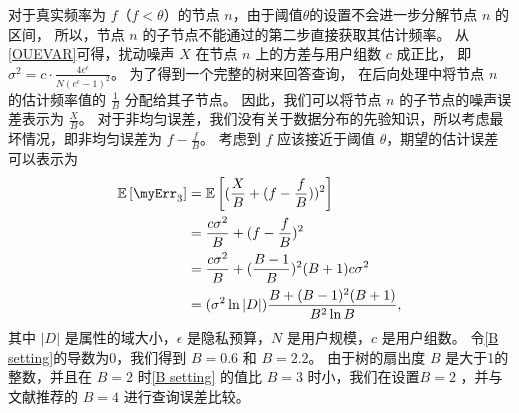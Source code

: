 对于真实频率为 $f$（$f<\theta$）的节点 $n$，\myahead 由于阈值$\theta$的设置不会进一步分解节点 $n$ 的区间，
所以，节点 $n$ 的子节点不能通过\myahead 的第二步直接获取其估计频率。
从\autoref{OUEVAR}可得，扰动噪声 $X$ 在节点 $n$ 上的方差与用户组数 $c$ 成正比，
即 $\sigma^2 = c \cdot \frac{4e^{\epsilon}}{N\left(e^{\epsilon}-1\right)^{2}}$。
为了得到一个完整的树来回答查询，
\myahead 在后向处理中将节点 $n$ 的估计频率值的 $\frac{1}{B}$ 分配给其子节点。
因此，我们可以将节点 $n$ 的子节点的噪声误差表示为 $\frac{X}{B}$。
对于非均匀误差，我们没有关于数据分布的先验知识，所以考虑最坏情况，即非均匀误差为 $f-\frac{f}{B}$。
考虑到 $f$ 应该接近于阈值 $\theta$，期望的估计误差可以表示为
\begin{align}
    \mathbb{E}\left[\myErr_3\right] &= \mathbb{E}\left[(\frac{X}{B}+(f-\frac{f}{B}))^2\right] \nonumber \\
    &=\frac{c \sigma ^2}{B} + (f-\frac{f}{B})^2 \nonumber \\ 
    &=\frac{c \sigma ^2}{B} + (\frac{B-1}{B})^2 (B+1) c \sigma^2 \nonumber \\ 
    &=(\sigma^2\ln{|D|})\frac{B+(B-1)^2(B+1)}{B^2\ln{B}},
    \label{B setting}
\end{align}  
其中 $|D|$ 是属性的域大小，$\epsilon$ 是隐私预算，$N$ 是用户规模，$c$ 是用户组数。
令\autoref{B setting}的导数为0，我们得到 $B=0.6$ 和 $B=2.2$。
由于树的扇出度 $B$ 是大于1的整数，并且在 $B=2$ 时\autoref{B setting} 的值比 $B=3$ 时小，我们在\myahead 设置$B=2$ ，并与文献{\rm\parencite{wang2019answering, cormode2019answering}}推荐的 $B=4$ 进行查询误差比较。



